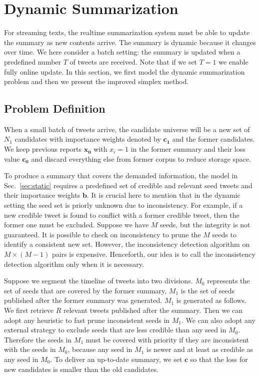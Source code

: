 \documentclass[runningheads]{llncs}
\begin{document}
\section{Dynamic Summarization}\label{sec:dynamic}
For streaming texts, the realtime summarization system must be able to update the summary as new contents arrive. The summary is dynamic because it changes over time. We here consider a batch setting: the summary is updated when a predefined number $T$ of tweets are received. Note that if we set $T=1$ we enable fully online update.  In this section, we first model the dynamic summarization problem and then we present the improved simplex method.

\subsection{Problem Definition}
When a small batch of tweets arrive, the candidate universe will be a new set of $N_1 $ candidates with importance weights denoted by $\mathbf{c_1}$ and the former candidates. We keep previous reports $\mathbf{x_0}$ with $x_i=1$ in the former summary and their loss value $\mathbf{c_0}$  and discard everything else from former corpus to reduce storage space.

To produce a summary that covers the demanded information, the model in Sec.~\ref{sec:static} requires a predefined set of credible and relevant seed tweets and their importance weights $\mathbf{b}$. It is crucial here to mention that in the dynamic setting the seed set is priorly unknown due to inconsistency. For example, if a new credible tweet is found to conflict with a former credible tweet, then the former one must be excluded. Suppose we have $M$ seeds, but the integrity is not guaranteed. It is possible to check on inconsistency to prune the $M$ seeds to identify a consistent new set. However, the inconsistency detection algorithm on $M\times (M-1)$ pairs is expensive. Henceforth, our idea is to call the inconsistency detection algorithm only when it is necessary.

Suppose we segment the timeline of tweets into two divisions. $M_0$ represents the set of seeds that are covered by the former summary, $M_1$ is the set of seeds published after the former summary was generated. $M_1$ is generated as follows. We first retrieve $R$ relevant tweets published after the summary. Then we can adopt any heuristic to fast prune inconsistent seeds in $M_1$. We can also adopt any external strategy to exclude seeds that are less credible than any seed in $M_0$. Therefore the seeds in $M_1$ must be covered with priority if they are inconsistent with the seeds in $M_0$, because any seed in  $M_1$ is newer and at least as credible as any seed in $M_0$.  To deliver an up-to-date summary, we set $\mathbf{c}$ so that the loss for new candidates is smaller than the old candidates.
\end{document}
